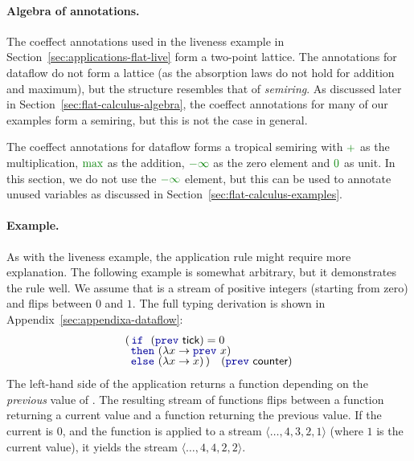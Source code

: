 
\paragraph{Algebra of annotations.}
The coeffect annotations used in the liveness example in Section~\ref{sec:applications-flat-live}
form a two-point lattice. The annotations for dataflow do not form a lattice (as the absorption
laws do not hold for addition and maximum), but the structure resembles that of \emph{semiring}.
As discussed later in Section~\ref{sec:flat-calculus-algebra}, the coeffect annotations for many 
of our examples form a semiring, but this is not the case in general.

The coeffect annotations for dataflow forms a tropical semiring with $\cclrd{+}$ as the multiplication,
$\cclrd{\textnormal{max}}$ as the addition, $\cclrd{-\infty}$ as the zero element and $\cclrd{0}$ as
unit. In this section, we do not use the $\cclrd{-\infty}$ element, but this can be used to annotate
unused variables as discussed in Section~\ref{sec:flat-calculus-examples}.  


\paragraph{Example.}
As with the liveness example, the application rule might require more explanation. The following
example is somewhat arbitrary, but it demonstrates the rule well. We assume that 
is a stream of positive integers (starting from zero) and  flips between $0$ and $1$.
The full typing derivation is shown in Appendix~\ref{sec:appendixa-dataflow}:
%
\begin{equation*}
\begin{array}{l}
(\,   \kvd{if}~~(\kvd{prev}~\ident{tick})=0\\[-0.25em]
\,\,\, \kvd{then}~(\lambda x \rightarrow \kvd{prev}~x)\\[-0.25em]
\,\,\, \kvd{else}~(\lambda x \rightarrow x) \,)\quad(\kvd{prev}~\ident{counter})
\end{array}
\end{equation*}
%
The left-hand side of the application returns a function depending on the \emph{previous}
value of . The resulting stream of functions flips between a function returning
a current value and a function returning the previous value. If the current  is 0, and
the function is applied to a stream $\langle{\ldots,4,3,2,1}\rangle$
(where $1$ is the current value), it yields the stream $\langle{\ldots,4,4,2,2}\rangle$.

